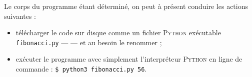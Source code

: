 \begin{exercise}[title=Suite de {\scshape Fibonacci} II, before skip=8pt, level=basic]
Le corps du programme étant déterminé, on peut à présent conduire les actions suivantes :
\begin{itemize}
	\item télécharger le code sur disque comme un fichier \textsc{Python} exécutable \texttt{fibonacci.py} ---  --- et au besoin le renommer ;
	\item exécuter le programme avec simplement l'interpréteur \textsc{Python} en ligne de commande :
	\texttt{\$ python3 fibonacci.py 56}.
\end{itemize}
\end{exercise}


